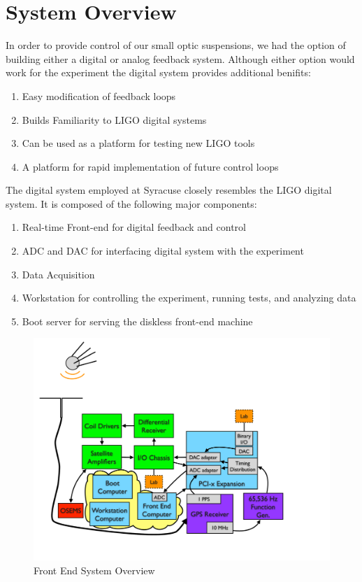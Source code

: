 \acresetall

\section{System Overview}

In order to provide control of our small optic suspensions, we had the option of building either a digital or analog feedback system.
Although either option would work for the experiment the digital system provides additional benifits:

\begin{enumerate}
\item Easy modification of feedback loops
\item Builds Familiarity to LIGO digital systems
\item Can be used as a platform for testing new LIGO tools
\item A platform for rapid implementation of future control loops
\end{enumerate}

The digital system employed at Syracuse closely resembles the LIGO digital system. It is composed of the following major components:
\begin{enumerate}
\item Real-time Front-end for digital feedback and control
\item ADC and DAC for interfacing digital system with the experiment
\item Data Acquisition
\item Workstation for controlling the experiment, running tests, and analyzing data
\item Boot server for serving the diskless front-end machine
\end{enumerate}

\begin{figure}[htbp]
	\centering
		\includegraphics[width=15cm]{./figures/FrontEndSystem.pdf}
	\caption[Front End System Overview]{Front End System Overview}
	\label{fig:front_end}
\end{figure}

